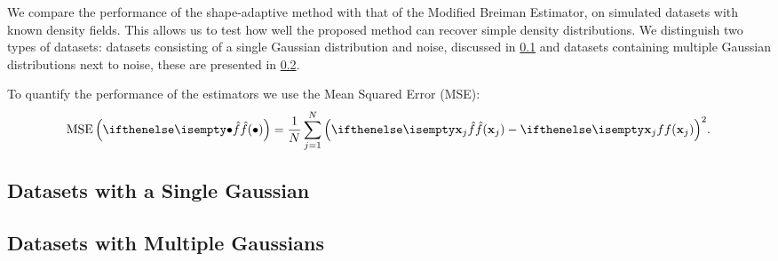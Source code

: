 We compare the performance of the shape-adaptive method with that of the Modified Breiman Estimator, on simulated datasets with known density fields. This allows us to test how well the proposed method can recover simple density distributions. We distinguish two types of datasets: datasets consisting of a single Gaussian distribution and noise, discussed in \cref{s:experiment:singlesphere} and datasets containing multiple Gaussian distributions next to noise, these are presented in \cref{s:experiment:multisphere}.

To quantify the performance of the estimators we use the Mean Squared Error (MSE):
\begin{equation*}
	\varMSE{\varEstimatedDensityFunction{\bullet}} = \frac{1}{\varNumPatterns} \sum_{\itXs = 1}^{\varNumPatterns} {\left(\varEstimatedDensityFunction{\varPattern[\itXs]} - \varDensityFunction{\varPattern[\itXs]} \right)}^2.
\end{equation*}

\subsection{Datasets with a Single Gaussian}
\label{s:experiment:singlesphere}


\subsection{Datasets with Multiple Gaussians}
\label{s:experiment:multisphere}



\oldStuff

